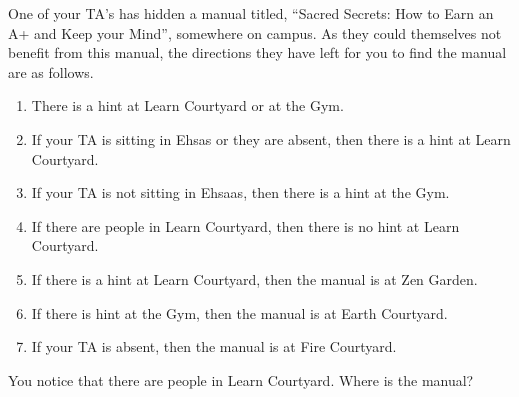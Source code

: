 \documentclass[addpoints]{exam}
\begin{document}
\begin{questions}
\question[5] One of your TA's has hidden a manual titled, ``Sacred Secrets: How to Earn an A+ and Keep your Mind'', somewhere on campus. As they could themselves not benefit from this manual, the directions they have left for you to find the manual are as follows.
  \begin{enumerate}
  \item There is a hint at Learn Courtyard or at the Gym.
  \item If your TA is sitting in Ehsas or they are absent, then there is a hint at Learn Courtyard.
  \item If your TA is not sitting in Ehsaas, then there is a hint at the Gym.
  \item If there are people in Learn Courtyard, then there is no hint at Learn Courtyard.
  \item If there is a hint at Learn Courtyard, then the manual is at Zen Garden.
  \item If there is hint at the Gym, then the manual is at Earth Courtyard.
  \item If your TA is absent, then the manual is at Fire Courtyard.
  \end{enumerate}
  You notice that there are people in Learn Courtyard. Where is the manual?


\end{questions}
\end{document}
